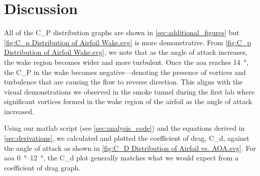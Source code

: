 \chapter{Discussion}
\label{cp:discussion}

All of the \gls{C_P} distribution graphs are shown in \autoref{sec:additional_figures} but \autoref{fig:C_p Distribution of Airfoil Wake.svg} is more demonstrative. From \autoref{fig:C_p Distribution of Airfoil Wake.svg}, we note that as the angle of attack increases, the wake region becomes wider and more turbulent. Once the \acrshort{aoa} reaches \qty{14}{\degree}, the \gls{C_P} in the wake becomes negative—denoting the presence of vortices and turbulence that are causing the flow to reverse direction. This aligns with the visual demonstrations we observed in the smoke tunnel during the first lab where significant vortices formed in the wake region of the airfoil as the angle of attack increased.

Using our \acrfull{matlab} script (see \autoref{sec:analysis_code}) and the equations derived in \autoref{sec:derivations}, we calculated and plotted the coefficient of drag, \gls{C_d}, against the angle of attack as shown in \autoref{fig:C_D Distribution of Airfoil vs. AOA.svg}. For \acrshort{aoa} \qtyrange{0}{12}{\degree}, the \gls{C_d} plot generally matches what we would expect from a coefficient of drag graph. 